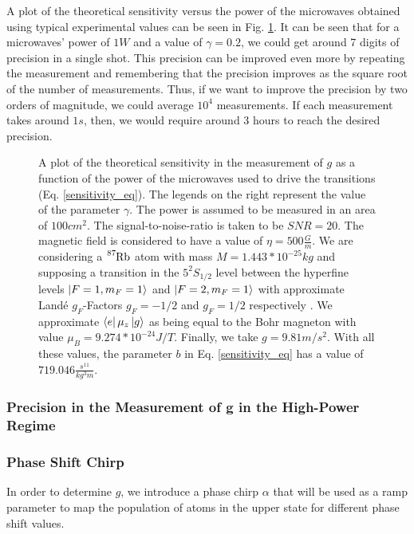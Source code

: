 \documentclass{article}
\begin{document}
A plot of the theoretical sensitivity versus the power of the microwaves obtained using typical experimental values can be seen in Fig. \ref{precision_vs_power_figure}. It can be seen that for a microwaves' power of $1W$ and a value of $\gamma=0.2$, we could get around 7 digits of precision in a single shot. This precision can be improved even more by repeating the measurement and remembering that the precision improves as the square root of the number of measurements\cite{Bevington_Robinson_Blair_Mallinckrodt_McKay_1993}. Thus, if we want to improve the precision by two orders of magnitude, we could average $10^{4}$ measurements. If each measurement takes around $1s$, then, we would require around $3$ hours to reach the desired precision.

\begin{figure}
    \centering
    
    \caption{A plot of the theoretical sensitivity in the measurement of $g$ as a function of the power of the microwaves used to drive the transitions (Eq. \ref{sensitivity_eq}). The legends on the right represent the value of the parameter $\gamma$. The power is assumed to be measured in an area of $100cm^2$. The signal-to-noise-ratio is taken to be $SNR=20$. The magnetic field is considered to have a value of $\eta = 500 \frac{G}{m}$. We are considering a $\ce{^{87}_{}Rb}$ atom with mass $M=1.443*10^{-25}kg$ and supposing a transition in the $5^{2}S_{1/2}$ level between the hyperfine levels $\ket{F=1, m_{F}=1}$ and $\ket{F=2, m_{F}=1}$ with approximate Landé $g_{F}$-Factors $g_{F}=-1/2$ and $g_{F}=1/2$ respectively \cite{Steck2010}. We approximate $\bra{e} \mu_{z} \ket{g}$ as being equal to the Bohr magneton with value $\mu_{B}=9.274*10^{-24}J/T$. Finally, we take $g=9.81 m/s^2$. With all these values, the parameter $b$ in Eq. \ref{sensitivity_eq} has a value of $719.046 \frac{s^{11}}{kg^{3}m}$.}
    \label{precision_vs_power_figure}
\end{figure}

\subsubsection{Precision in the Measurement of g in the High-Power Regime}


\subsubsection{Phase Shift Chirp}
In order to determine $g$, we introduce a phase chirp $\alpha$ that will be used as a ramp parameter to map the population of atoms in the upper state for different phase shift values. 
\end{document}
